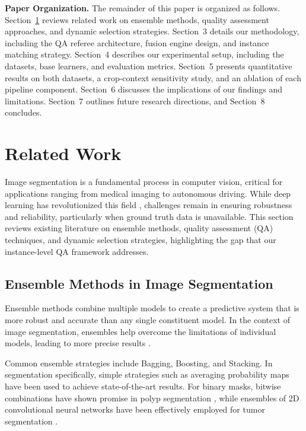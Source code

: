 \textbf{Paper Organization.} The remainder of this paper is organized as follows. Section~\ref{sec:related_work} reviews related work on ensemble methods, quality assessment approaches, and dynamic selection strategies. Section~3 details our methodology, including the QA referee architecture, fusion engine design, and instance matching strategy. Section~4 describes our experimental setup, including the datasets, base learners, and evaluation metrics. Section~5 presents quantitative results on both datasets, a crop-context sensitivity study, and an ablation of each pipeline component. Section~6 discusses the implications of our findings and limitations. Section~7 outlines future research directions, and Section~8 concludes.



\section{Related Work} \label{sec:related_work}

Image segmentation is a fundamental process in computer vision, critical for applications ranging
from medical imaging to autonomous driving. While deep learning has revolutionized this field
\cite{minaee2021image}, challenges remain in ensuring robustness and reliability, particularly when
ground truth data is unavailable. This section reviews existing literature on ensemble methods,
quality assessment (QA) techniques, and dynamic selection strategies, highlighting the gap that our
instance-level QA framework addresses.

\subsection{Ensemble Methods in Image Segmentation}
Ensemble methods combine multiple models to create a predictive system that is more robust and
accurate than any single constituent model. In the context of image segmentation, ensembles help
overcome the limitations of individual models, leading to more precise results
\cite{nanni2023exploring}.

Common ensemble strategies include Bagging, Boosting, and Stacking. In segmentation specifically,
simple strategies such as averaging probability maps have been used to achieve state-of-the-art
results. For binary masks, bitwise combinations have shown promise in polyp segmentation
\cite{kang2019ensemble}, while ensembles of 2D convolutional neural networks have been effectively
employed for tumor segmentation \cite{lyksborg2015ensemble}.

